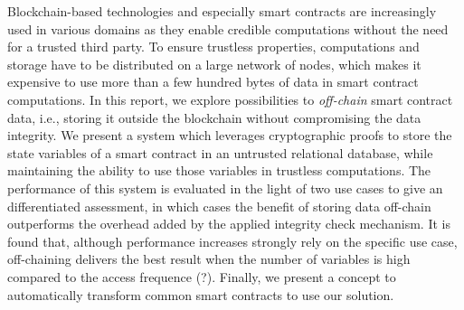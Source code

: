 Blockchain-based technologies and especially smart contracts are increasingly used in various domains as they enable credible computations without the need for a trusted third party. To ensure trustless properties, computations and storage have to be distributed on a large network of nodes, which makes it expensive to use more than a few hundred bytes of data in smart contract computations. In this report, we explore possibilities to \emph{off-chain} smart contract data, i.e., storing it outside the blockchain without compromising the data integrity. We present a system which leverages cryptographic proofs to store the state variables of a smart contract in an untrusted relational database, while maintaining the ability to use those variables in trustless computations. The performance of this system is evaluated in the light of two use cases to give an differentiated assessment, in which cases the benefit of storing data off-chain outperforms the overhead added by the applied integrity check mechanism. It is found that, although performance increases strongly rely on the specific use case, off-chaining delivers the best result when the number of variables is high compared to the access frequence (?). Finally, we present a concept to automatically transform common smart contracts to use our solution.
